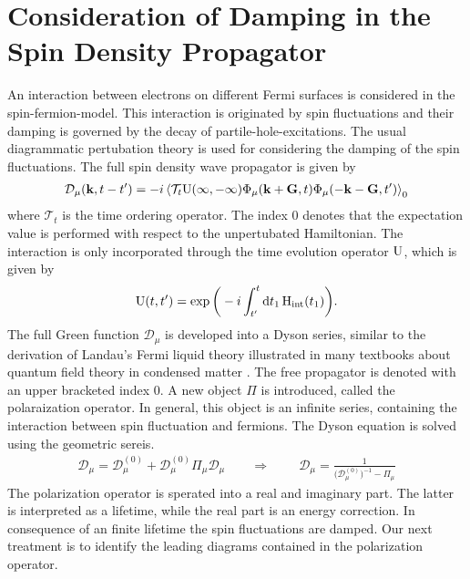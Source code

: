 \section{Consideration of Damping in the Spin Density Propagator}
\label{appsec:damped propagator}
%
%
An interaction between electrons on different Fermi surfaces is considered in the spin-fermion-model.
This interaction is originated by spin fluctuations and their damping is governed by the decay of partile-hole-excitations.
The usual diagrammatic pertubation theory is used for considering the damping of the spin fluctuations.
The full spin density wave propagator is given by
%
\begin{align}
	\mathcal{D}_{\mu}(\vb{k}, t-t') = -i \expval{\mathcal{T}_{t} \mathrm{U}(\infty, -\infty) \Phi_{\mu}(\vb{k}+\vb{G},t) \Phi_{\mu}(-\vb{k}-\vb{G},t')}_{0}
	\label{appeq:full spin density wave propagator}
\end{align}
%
where $\mathcal{T}_{t}$ is the time ordering operator.
The index $0$ denotes that the expectation value is performed with respect to the unpertubated Hamiltonian.
The interaction is only incorporated through the time evolution operator $\mathrm{U}$, which is given by
%
\begin{align}
	\mathrm{U}(t,t') = \exp\bigg(-i\int_{t'}^{t} \dd{t_{1}} \mathrm{H}_{\mathrm{int}}(t_{1})\bigg).
	\label{appeq:time evolution operator}
\end{align}
%
The full Green function $\mathcal{D}_{\mu}$ is developed into a Dyson series, similar to the derivation of Landau's Fermi liquid theory illustrated in many textbooks about quantum field theory in condensed matter \cite{Nolting}.
The free propagator is denoted with an upper bracketed index 0.
A new object $\Pi$ is introduced, called the polaraization operator.
In general, this object is an infinite series, containing the interaction between spin fluctuation and fermions.
The Dyson equation is solved using the geometric sereis.
%
\begin{align}
	\mathcal{D}_{\mu} = \mathcal{D}_{\mu}^{(0)} + \mathcal{D}_{\mu}^{(0)} \Pi_{\mu} \mathcal{D}_{\mu}
	\qquad \Rightarrow\ \qquad
	\mathcal{D}_{\mu} = \frac{1}{\big(\mathcal{D}_{\mu}^{(0)}\big)^{-1} - \Pi_{\mu}}
	\label{appeq:Dyson equation}
\end{align}
%
The polarization operator is sperated into a real and imaginary part.
The latter is interpreted as a lifetime, while the real part is an energy correction.
In consequence of an finite lifetime the spin fluctuations are damped.
Our next treatment is to identify the leading diagrams contained in the polarization operator.

